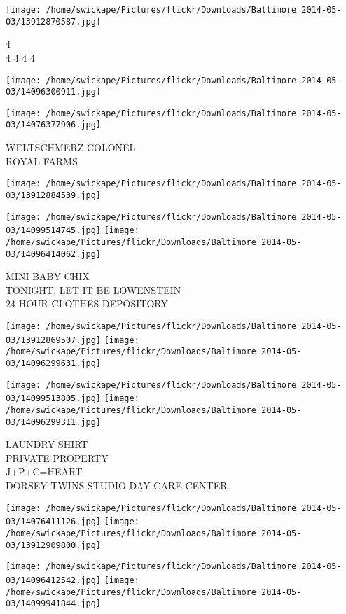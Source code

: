 \documentclass[10pt,letterpaper]{article}
\begin{document}
\vspace{0.25in}
\texttt{[image: /home/swickape/Pictures/flickr/Downloads/Baltimore 2014-05-03/13912870587.jpg]}

4\\
4 4 4 4
\pagebreak

\texttt{[image: /home/swickape/Pictures/flickr/Downloads/Baltimore 2014-05-03/14096300911.jpg]}

\vspace{0.25in}
\texttt{[image: /home/swickape/Pictures/flickr/Downloads/Baltimore 2014-05-03/14076377906.jpg]}

WELTSCHMERZ COLONEL\\
ROYAL FARMS
\pagebreak

\texttt{[image: /home/swickape/Pictures/flickr/Downloads/Baltimore 2014-05-03/13912884539.jpg]}

\vspace{0.25in}
\texttt{[image: /home/swickape/Pictures/flickr/Downloads/Baltimore 2014-05-03/14099514745.jpg]}
\texttt{[image: /home/swickape/Pictures/flickr/Downloads/Baltimore 2014-05-03/14096414062.jpg]}

MINI BABY CHIX\\
TONIGHT, LET IT BE LOWENSTEIN\\
24 HOUR CLOTHES DEPOSITORY
\pagebreak

\texttt{[image: /home/swickape/Pictures/flickr/Downloads/Baltimore 2014-05-03/13912869507.jpg]}
\texttt{[image: /home/swickape/Pictures/flickr/Downloads/Baltimore 2014-05-03/14096299631.jpg]}

\texttt{[image: /home/swickape/Pictures/flickr/Downloads/Baltimore 2014-05-03/14099513805.jpg]}
\texttt{[image: /home/swickape/Pictures/flickr/Downloads/Baltimore 2014-05-03/14096299311.jpg]}

LAUNDRY SHIRT\\
PRIVATE PROPERTY\\
J+P+C=HEART\\
DORSEY TWINS STUDIO DAY CARE CENTER
\pagebreak

\texttt{[image: /home/swickape/Pictures/flickr/Downloads/Baltimore 2014-05-03/14076411126.jpg]}
\texttt{[image: /home/swickape/Pictures/flickr/Downloads/Baltimore 2014-05-03/13912909800.jpg]}

\texttt{[image: /home/swickape/Pictures/flickr/Downloads/Baltimore 2014-05-03/14096412542.jpg]}
\texttt{[image: /home/swickape/Pictures/flickr/Downloads/Baltimore 2014-05-03/14099941844.jpg]}
\end{document}
